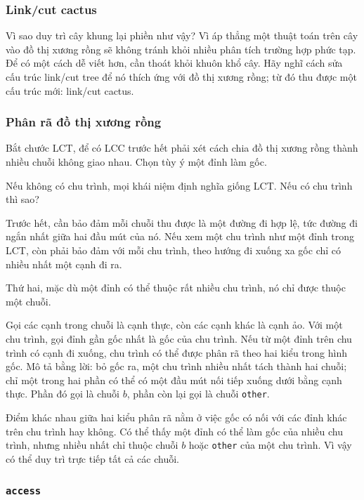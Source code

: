 \documentclass[11pt]{article}
\begin{document}
\subsubsection{Link/cut cactus}

Vì sao duy trì cây khung lại phiền như vậy? Vì áp thẳng một thuật toán trên cây
vào đồ thị xương rồng sẽ không tránh khỏi nhiều phân tích trường hợp phức tạp.
Để có một cách dễ viết hơn, cần thoát khỏi khuôn khổ cây. Hãy nghĩ cách sửa cấu
trúc link/cut tree để nó thích ứng với đồ thị xương rồng; từ đó thu được một cấu
trúc mới: link/cut cactus.

\subsubsection{Phân rã đồ thị xương rồng}

Bắt chước LCT, để có LCC trước hết phải xét cách chia đồ thị xương rồng thành
nhiều chuỗi không giao nhau. Chọn tùy ý một đỉnh làm gốc.

Nếu không có chu trình, mọi khái niệm định nghĩa giống LCT. Nếu có chu trình thì
sao?

Trước hết, cần bảo đảm mỗi chuỗi thu được là một đường đi hợp lệ, tức đường đi
ngắn nhất giữa hai đầu mút của nó. Nếu xem một chu trình như một đỉnh trong LCT,
còn phải bảo đảm với mỗi chu trình, theo hướng đi xuống xa gốc chỉ có nhiều nhất
một cạnh đi ra.

Thứ hai, mặc dù một đỉnh có thể thuộc rất nhiều chu trình, nó chỉ được thuộc một
chuỗi.

Gọi các cạnh trong chuỗi là cạnh thực, còn các cạnh khác là cạnh ảo. Với một
chu trình, gọi đỉnh gần gốc nhất là gốc của chu trình. Nếu từ một đỉnh trên chu
trình có cạnh đi xuống, chu trình có thể được phân rã theo hai kiểu trong hình
gốc. Mô tả bằng lời: bỏ gốc ra, một chu trình nhiều nhất tách thành hai chuỗi;
chỉ một trong hai phần có thể có một đầu mút nối tiếp xuống dưới bằng cạnh thực.
Phần đó gọi là chuỗi \(b\), phần còn lại gọi là chuỗi \texttt{other}.

Điểm khác nhau giữa hai kiểu phân rã nằm ở việc gốc có nối với các đỉnh khác
trên chu trình hay không. Có thể thấy một đỉnh có thể làm gốc của nhiều chu
trình, nhưng nhiều nhất chỉ thuộc chuỗi \(b\) hoặc \texttt{other} của một chu
trình. Vì vậy có thể duy trì trực tiếp tất cả các chuỗi.

\subsubsection{\texttt{access}}
\end{document}
